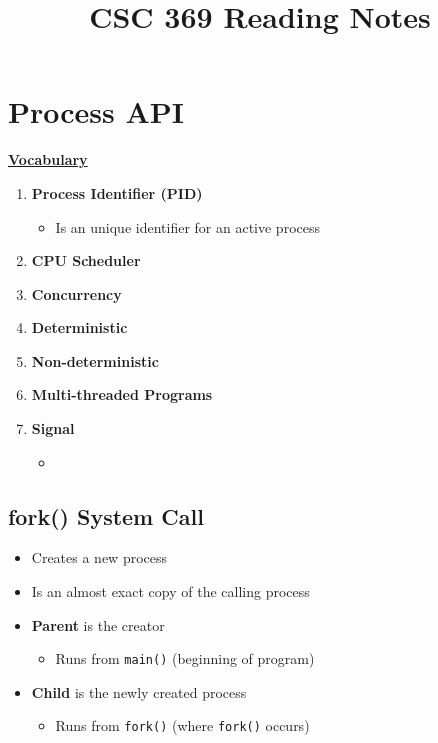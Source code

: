 \documentclass[12pt]{article}
\begin{document}
\title{CSC 369 Reading Notes}

\section{Process API}

\begin{mdframed}
\underline{\textbf{Vocabulary}}

\bigskip

\begin{enumerate}[1.]
    \item \textbf{Process Identifier (PID)}
    \begin{itemize}
        \item Is an unique identifier for an active process
    \end{itemize}
    \item \textbf{CPU Scheduler}
    \item \textbf{Concurrency}
    \item \textbf{Deterministic}
    \item \textbf{Non-deterministic}
    \item \textbf{Multi-threaded Programs}
    \item \textbf{Signal}
    \begin{itemize}
        \item
    \end{itemize}
\end{enumerate}

\end{mdframed}

\subsection{fork() System Call}
\begin{itemize}
    \item Creates a new process
    \item Is an almost exact copy of the calling process
    \item \textbf{Parent} is the creator
    \begin{itemize}
        \item Runs from \texttt{main()} (beginning of program)
    \end{itemize}
    \item \textbf{Child} is the newly created process
    \begin{itemize}
        \item Runs from \texttt{fork()} (where \texttt{fork()} occurs)
    \end{itemize}
\end{itemize}
\end{document}
